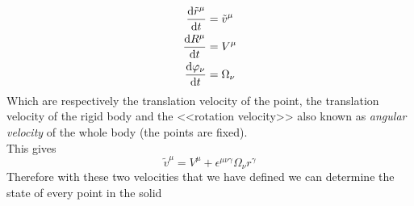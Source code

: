 \documentclass[../admech.tex]{subfiles}
\begin{document}
\begin{equation}
	\begin{aligned}
		\dv{\tilde{r}^\mu}{t}&=\tilde{v}^\mu\\
		\dv{R^\mu}{t}&=V^\mu\\
		\dv{\varphi_\nu}{t}&=\Omega_\nu
	\end{aligned}
	\label{eq:rigidbodyvel}
\end{equation}
Which are respectively the translation velocity of the point, the translation velocity of the rigid body and the <<rotation velocity>> also known as \emph{angular velocity} of the whole body (the points are fixed).\\
This gives
\begin{equation*}
	\tilde{v}^\mu=V^\mu+\epsilon^{\mu\nu\gamma}\Omega_\nu r^\gamma
\end{equation*}
Therefore with these two velocities that we have defined we can determine the state of every point in the solid
\end{document}
